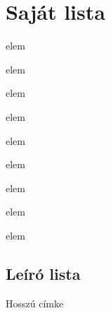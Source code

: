\documentclass[12pt]{article}
\begin{document}
\section{Saját lista}
\setcounter{mycounter}{1}
\begin{myenum}
\item[\label=(\themycounter)] elem
\item[\label=(\$)] elem
\item[\label=(\themycounter)] elem
\begin{myenum}
\item elem
\begin{myenum}
\item elem
\label{számozott}
\begin{myenum}
\item elem
\begin{myenum}
\item elem
\end{myenum}
\end{myenum}
\end{myenum}
\end{myenum}
\end{myenum}
\hulipsum[2]
\begin{myenum}
\item[\label=(\themycounter)] elem
\item[\label=(\themycounter)] elem
\end{myenum}
\newpage
\subsection{Leíró lista}
\begin{description}[style=nextline]
\item[] \hulipsum[1]
\label{Címke nélküli}
\item[Slanted] \hulipsum[2]
\begin{description}
\item[Hosszú címke] \hulipsum[2]
\end{description}
\end{description}
\newpage
\tableofcontents
\end{document}
